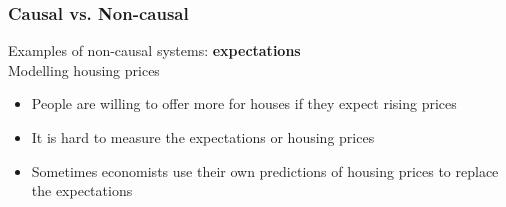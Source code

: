 \documentclass{beamer}
\begin{document}

\begin{frame}
\frametitle{Causal vs. Non-causal}
\vspace{-15.5ex}
Examples of non-causal systems: \textbf{expectations}\\
\medskip
Modelling housing prices\\
\begin{itemize}
\item People are willing to offer more for houses if they expect rising prices
\item It is hard to measure the expectations or housing prices
\item Sometimes economists use their own predictions of housing prices to replace the expectations
\end{itemize}
\end{frame}

\end{document}
